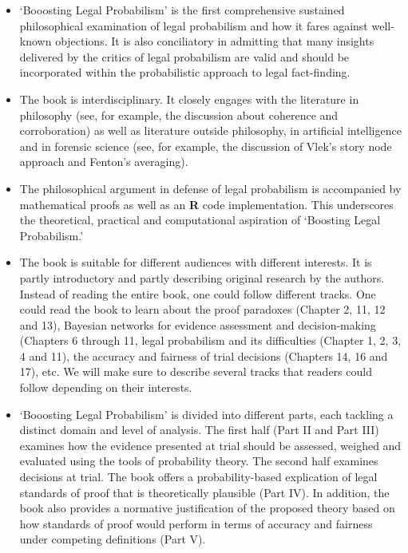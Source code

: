 \documentclass[
  10pt,
  dvipsnames,enabledeprecatedfontcommands]{scrartcl}
\begin{document}
\begin{itemize}
\item
  `Booosting Legal Probabilism' is the first comprehensive sustained
  philosophical examination of legal probabilism and how it fares
  against well-known objections. It is also conciliatory in admitting
  that many insights delivered by the critics of legal probabilism are
  valid and should be incorporated within the probabilistic approach to
  legal fact-finding.
\item
  The book is interdisciplinary. It closely engages with the literature
  in philosophy (see, for example, the discussion about coherence and
  corroboration) as well as literature outside philosophy, in artificial
  intelligence and in forensic science (see, for example, the discussion
  of Vlek's story node approach and Fenton's averaging).
\item
  The philosophical argument in defense of legal probabilism is
  accompanied by mathematical proofs as well as an \textbf{\textsf{R}}
  code implementation. This underscores the theoretical, practical and
  computational aspiration of `Boosting Legal Probabilism.'
\item
  The book is suitable for different audiences with different interests.
  It is partly introductory and partly describing original research by
  the authors. Instead of reading the entire book, one could follow
  different tracks. One could read the book to learn about the proof
  paradoxes (Chapter 2, 11, 12 and 13), Bayesian networks for evidence
  assessment and decision-making (Chapters 6 through 11, legal
  probabilism and its difficulties (Chapter 1, 2, 3, 4 and 11), the
  accuracy and fairness of trial decisions (Chapters 14, 16 and 17),
  etc. We will make sure to describe several tracks that readers could
  follow depending on their interests.
\item
  `Booosting Legal Probabilism' is divided into different parts, each
  tackling a distinct domain and level of analysis. The first half (Part
  II and Part III) examines how the evidence presented at trial should
  be assessed, weighed and evaluated using the tools of probability
  theory. The second half examines decisions at trial. The book offers a
  probability-based explication of legal standards of proof that is
  theoretically plausible (Part IV). In addition, the book also provides
  a normative justification of the proposed theory based on how
  standards of proof would perform in terms of accuracy and fairness
  under competing definitions (Part V).
\end{itemize}
\end{document}
